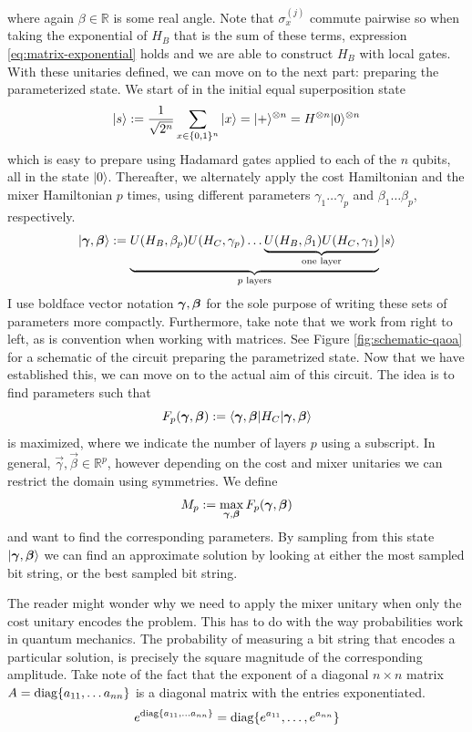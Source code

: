 where again $\beta \in \mathbb{R}$ is some real angle. Note that $\sigma_x^{(j)}$ commute pairwise so when taking the exponential of $H_B$ that is the sum of these terms, expression \eqref{eq:matrix-exponential} holds and we are able to construct $H_B$ with local gates. With these unitaries defined, we can move on to the next part: preparing the parameterized state. We start of in the initial equal superposition state
\begin{equation}
	|s\rangle := \frac{1}{\sqrt{2^n}}\sum_{x\in \{0,1\}^n} |x \rangle = |+\rangle^{\otimes n} = H^{\otimes n}|0\rangle^{\otimes n}
\end{equation} 
which is easy to prepare using Hadamard gates applied to each of the $n$ qubits, all in the state $|0\rangle$. 
Thereafter, we alternately apply the cost Hamiltonian and the mixer Hamiltonian $p$ times, using different parameters $\gamma_1 \dots \gamma_p$ and $\beta_1 \dots \beta_p$, respectively. 
\begin{equation}
	|\bm{\gamma}, \bm{\beta}\rangle := \underbrace{ U(H_B,\beta_p)U(H_C,\gamma_p) \dots \underbrace{U(H_B,\beta_1)U(H_C,\gamma_1)}_{\text{one layer}}}_{p \text{ layers}}|s\rangle
\end{equation}
I use boldface vector notation $\bm{\gamma},\bm{\beta}$ for the sole purpose of writing these sets of parameters more compactly. Furthermore, take note that we work from right to left, as is convention when working with matrices. See Figure \ref{fig:schematic-qaoa} for a schematic of the circuit preparing the parametrized state. Now that we have established this, we can move on to the actual aim of this circuit. The idea is to find parameters such that 
\begin{equation}
	F_p(\bm{\gamma},\bm{\beta}) := \langle \bm{\gamma},\bm{\beta} |H_C| \bm{\gamma},\bm{\beta} \rangle
\end{equation}
is maximized, where we indicate the number of layers $p$ using a subscript. In general, $\vec{\gamma},\vec{\beta} \in \mathbb{R}^p$, however depending on the cost and mixer unitaries we can restrict the domain using symmetries. We define 
\begin{equation}
M_p := \max_{\bm{\gamma},\bm{\beta}} F_p(\bm{\gamma},\bm{\beta})
\end{equation} and want to find the corresponding parameters. By sampling from this state $|\bm{\gamma},\bm{\beta} \rangle$ we can find an approximate solution by looking at either the most sampled bit string, or the best sampled bit string.

The reader might wonder why we need to apply the mixer unitary when only the cost unitary encodes the problem. This has to do with the way probabilities work in quantum mechanics. The probability of measuring a bit string that encodes a particular solution, is precisely the square magnitude of the corresponding amplitude. Take note of the fact that the exponent of a diagonal $n \times n$ matrix $A = \text{diag}\{a_{11}, \dots a_{nn}\}$ is a diagonal matrix with the entries exponentiated.  
\begin{equation}
	e^{\text{diag}\{a_{11},\dots a_{nn}\}} = \text{diag}\{e^{a_{11}},\dots, e^{a_{nn}}\}
\end{equation}

